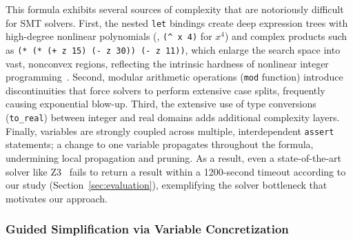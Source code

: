 This formula exhibits several sources of complexity that are notoriously difficult for SMT solvers. First, the nested \texttt{let} bindings create deep expression trees with high-degree nonlinear polynomials (\eg, \texttt{(\textasciicircum{} x 4)} for $x^4$) and complex products such as \texttt{(* (* (+ z 15) (- z 30)) (- z 11))}, which enlarge the search space into vast, nonconvex regions, reflecting the intrinsic hardness of nonlinear integer programming~\cite{murty2002complexity}.
Second, modular arithmetic operations (\texttt{mod} function) introduce discontinuities that force solvers to perform extensive case splits, frequently causing exponential blow-up.
Third, the extensive use of type conversions (\texttt{to\_real}) between integer and real domains adds additional complexity layers.
Finally, variables are strongly coupled across multiple, interdependent \texttt{assert} statements; a change to one variable propagates throughout the formula, undermining local propagation and pruning. As a result, even a state-of-the-art solver like Z3~\cite{demoura2008z3} fails to return a result within a 1200-second timeout according to our study (Section~\ref{sec:evaluation}), exemplifying the solver bottleneck that motivates our approach. 

\subsubsection{Guided Simplification via Variable Concretization}

